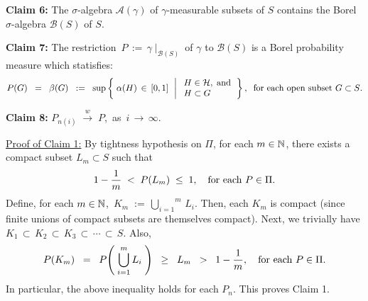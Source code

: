 \vskip 0.5cm
\begin{center}
\begin{minipage}{6.5in}
\textbf{Claim 6:}\quad
The $\sigma$-algebra $\mathcal{A}(\gamma)$ of $\gamma$-measurable subsets of $S$ contains
the Borel $\sigma$-algebra $\mathcal{B}(S)$ of $S$.
\end{minipage}
\end{center}

\vskip 0.5cm
\begin{center}
\begin{minipage}{6.5in}
\textbf{Claim 7:}\quad
The restriction \,$P \, := \, \gamma\;\vert_{\mathcal{B}(S)}$\, of $\gamma$ to $\mathcal{B}(S)$
is a Borel probability measure which statisfies:
\begin{equation*}
P(G)
\;\; = \;\; \beta(G)
\;\; := \;\;
\sup\left\{\;
\alpha(H) \,\in\, [0,1]
\,\;\left\vert\;
\begin{array}{l} H \in \mathcal{H}, \;\textnormal{and} \\ H \subset G \end{array}
\right.
\right\},
\;\;
\textnormal{for each open subset $G \subset S$}.
\end{equation*}
\end{minipage}
\end{center}

\vskip 0.5cm
\begin{center}
\begin{minipage}{6.5in}
\textbf{Claim 8:}\quad
$P_{n(i)} \;\overset{w}{\longrightarrow}\; P$,\,
as \,$i\,\longrightarrow\,\infty$.
\end{minipage}
\end{center}

\vskip 0.5cm
\noindent
\underline{Proof of Claim 1:}\quad
By tightness hypothesis on $\Pi$,
for each $m \in \mathbb{N}$,
there exists a compact subset $L_{m} \subset S$ such that
\begin{equation*}
1 - \dfrac{1}{m} \; < \; P(L_{m}) \; \leq \; 1,
\quad
\textnormal{for each $P \in \Pi$}.
\end{equation*}
Define, for each $m \in \mathbb{N}$,
\,$K_{m} \; := \, \overset{m}{\underset{i=1}{\bigcup}}\,L_{i}$.
Then, each $K_{m}$ is compact (since finite unions of compact subsets are themselves compact).
Next, we trivially have\;
$K_{1} \,\subset\, K_{2} \,\subset\, K_{3} \,\subset\, \cdots \,\subset\, S$.
Also,
\begin{equation*}
P(K_{m})
\;\;=\;\; P\!\left(\;\bigcup_{i=1}^{m}L_{i}\;\right)
\;\;\geq\;\; L_{m}
\;\; > \;\; 1 - \dfrac{1}{m},
\quad
\textnormal{for each $P \in \Pi$}.
\end{equation*}
In particular, the above inequality holds for each $P_{n}$. This proves Claim 1.


